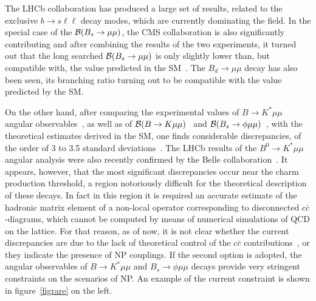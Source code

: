 The LHCb collaboration has produced a large set of results, related to the exclusive $b \to s\ell \ell $ decay modes, which  are currently dominating the field.  
In the special case of the ${\cal B}(B_s\rightarrow \mu\mu)$, the CMS collaboration is also significantly contributing and after combining the results of the two experiments, 
it turned out that the long searched ${\cal B}(B_s\rightarrow \mu\mu)$ is only slightly lower than, but compatible with, the value
predicted in the SM~\cite{CMS:2014xfa}. The $B_d\to \mu\mu$ decay has also been seen, its branching ratio turning out to be compatible with the value predicted by the SM. 
\par
On the other hand,  after comparing the experimental values of $B\to K^\ast \mu\mu$  angular observables~\cite{Aaij:2015oid}, as well as of ${\cal B}(B\rightarrow K \mu\mu)$~\cite{Aaij:2014pli} and ${\cal B}(B_s\rightarrow \phi \mu\mu)$~\cite{Aaij:2015esa}, with the theoretical estimates derived in the SM, 
one finds considerable discrepancies, of the order of 3 to 3.5 standard deviations~\cite{Altmannshofer:2015sma, Descotes-Genon:2015uva, Descotes-Genon:2016hem}.  The LHCb results of the $B^0\to K^\ast \mu\mu$  angular analysis were also recently confirmed  by the Belle collaboration~\cite{Abdesselam:2016llu}.  
It appears, however, that the most significant discrepancies occur near the charm production threshold, a region notoriously difficult for the theoretical 
description of these decays. In fact in this region it is required an accurate estimate of the hadronic matrix element of a non-local operator corresponding to disconnected $c\bar c$-diagrams, which 
cannot be computed by means of numerical simulations of QCD on the lattice. For that reason, as of now, it is not clear whether the current discrepancies are due to the lack of theoretical 
control of the $c\bar c$ contributions~\cite{Ciuchini:2015qxb}, or they indicate the presence of NP couplings. If the second option is adopted, the angular observables of $B\to K^\ast \mu\mu$ and $B_s\to \phi \mu\mu$ 
decays  provide very stringent constraints on the scenarios of NP. An example of the current constraint is shown in figure~\ref{figrare} on the left. 

